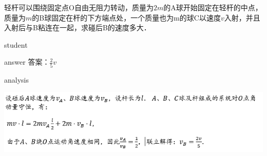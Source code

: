\begin{example}
	轻杆可以围绕固定点O自由无阻力转动，质量为$ 2m $的A球开始固定在轻杆的中点，质量为$ m $的B球固定在杆的下方端点处，一个质量也为m的球C以速度$ v $入射，并且入射后与B粘连在一起，求碰后B的速度多大．
	
	\begin{taggedblock}{student}
		\vspace*{2cm}
	\end{taggedblock}
	
	
	\begin{taggedblock}{answer}
		答案：$ \frac{2}{5}v $
	\end{taggedblock}
	
	
	\begin{taggedblock}{analysis}
		\begin{center}
\includegraphics[width=0.9\linewidth]{image/am-13}
\end{center}

	\end{taggedblock}
\end{example}


